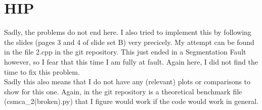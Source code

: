\documentclass[11pt]{article}
\begin{document}
\section{HIP}

Sadly, the problems do not end here. I also tried to implement this by following the slides (pages 3 and 4 of slide set B) very precicely. My attempt can be found in the file 2.cpp in the git repository. This just ended in a Segmentation Fault however, so I fear that this time I am fully at fault. Again here, I did not find the time to fix this problem.\\

Sadly this also means that I do not have any (relevant) plots or comparisons to show for this one. Again, in the git repository is a theoretical benchmark file (csmca_2(broken).py) that I figure would work if the code would work in general.
\end{document}
